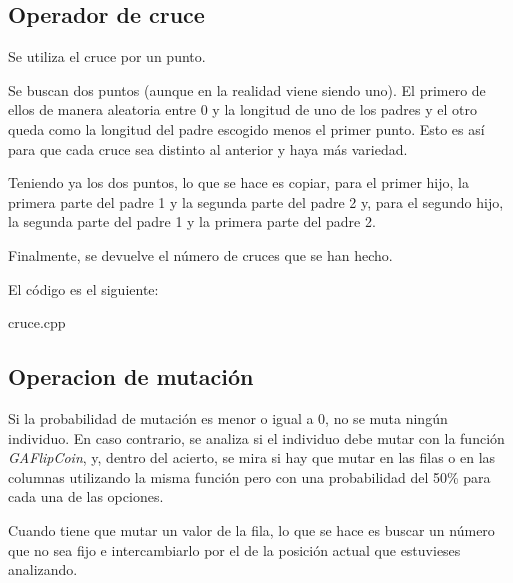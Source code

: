 \documentclass[a4,11pt]{article}
\begin{document}
\subsection{Operador de cruce}\label{des:cruce}

Se utiliza el cruce por un punto.
 
Se buscan dos puntos (aunque en la realidad viene siendo uno). El primero de ellos de manera aleatoria entre 0 y la longitud de uno de los padres y el otro queda como la longitud del padre escogido menos el primer punto. Esto es así para que cada cruce sea distinto al anterior y haya más variedad.
 
Teniendo ya los dos puntos, lo que se hace es copiar, para el primer hijo, la primera parte del padre 1 y la segunda parte del padre 2 y, para el segundo hijo, la segunda parte del padre 1 y la primera parte del padre 2.

Finalmente, se devuelve el número de cruces que se han hecho.

El código es el siguiente:

\newcommand{\grisclaro}{\color[gray]{0.99}}
\newcommand{\gris}{\color[gray]{0.9}}
\newcommand{\grisos}{\color[gray]{0.5}}

\newcommand{\showprog}[1]
{
\begin{minipage}{\textwidth}

 {#1}
\end{minipage} 
}    

\showprog{cruce.cpp}\label{img:cruce}
 
\subsection{Operacion de mutación}\label{des:mutacion}

Si la probabilidad de mutación es menor o igual a 0, no se muta ningún individuo. En caso contrario, se analiza si el individuo debe mutar con la función \emph{GAFlipCoin}, y, dentro del acierto, se mira si hay que mutar en las filas o en las columnas utilizando la misma función pero con una probabilidad del 50\% para cada una de las opciones.

	Cuando tiene que mutar un valor de la fila, lo que se hace es buscar un número que no sea fijo e intercambiarlo por el de la posición actual que estuvieses analizando.
\end{document}
